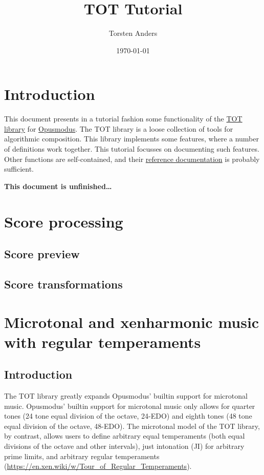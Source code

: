 \documentclass[11pt]{article}
\author{Torsten Anders}
\date{\today}
\title{TOT Tutorial}
\begin{document}
\maketitle
\setcounter{tocdepth}{4}
\tableofcontents


\section{Introduction}
\label{sec:org880776f}

This document presents in a tutorial fashion some functionality of the \href{https://github.com/tanders/tot}{TOT library} for
\href{http://opusmodus.com/}{Opusmodus}. The TOT library is a loose collection of tools for algorithmic composition. This library
implements some features, where a number of definitions work together. This tutorial focusses on
documenting such features. Other functions are self-contained, and their \href{../reference/index.html}{reference documentation}
is probably sufficient.


\textbf{This document is unfinished\ldots{}}


\section{Score processing}
\label{sec:org046319c}

\subsection{Score preview}
\label{sec:org0d241bb}


\subsection{Score transformations}
\label{sec:orga598e42}


\section{Microtonal and xenharmonic music with regular temperaments}
\label{sec:orgd94fd22}

\subsection{Introduction}
\label{sec:org6df8c16}

The TOT library greatly expands Opusmodus' builtin support for microtonal music.  Opusmodus'
builtin support for microtonal music only allows for quarter tones (24 tone equal division of
the octave, 24-EDO) and eighth tones (48 tone equal division of the octave, 48-EDO). The
microtonal model of the TOT library, by contrast, allows users to define arbitrary equal
temperaments (both equal divisions of the octave and other intervals), just intonation (JI) for
arbitrary prime limits, and arbitrary regular temperaments
(\url{https://en.xen.wiki/w/Tour\_of\_Regular\_Temperaments}). 
\end{document}
